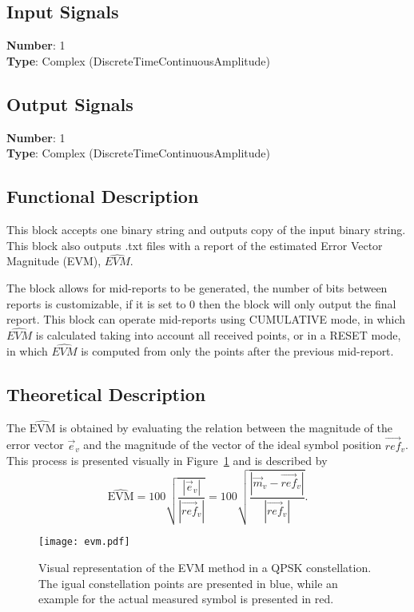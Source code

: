 \begin{refsection}
\begin{itemize}
\end{itemize}




\subsection*{Input Signals}

\textbf{Number}: 1\\
\textbf{Type}: Complex (DiscreteTimeContinuousAmplitude)


\subsection*{Output Signals}

\textbf{Number}: 1\\
\textbf{Type}: Complex (DiscreteTimeContinuousAmplitude)

\subsection*{Functional Description}

This block accepts one binary string and outputs copy of the input binary string. This block also outputs .txt files with a report of the estimated Error Vector Magnitude (EVM), $\widehat{EVM}$.
\par
The block allows for mid-reports to be generated, the number of bits between reports is customizable, if it is set to 0 then the block will only output the final report. This block can operate mid-reports using CUMULATIVE mode, in which $\widehat{EVM}$ is calculated taking into account all received points, or in a RESET mode, in which $\widehat{EVM}$ is computed from only the points after the previous mid-report.

\subsection*{Theoretical Description}

The $\widehat{\text{EVM}}$ is obtained by evaluating the relation between the magnitude of the error vector $\vec{e}_v$ and the magnitude of the vector of the ideal symbol position $\vec{ref}_v$. This process is presented visually in Figure~\ref{fig:EVM} and is described by
\begin{equation}
\widehat{\text{EVM}}=100\sqrt{\frac{|\vec{e}_v|}{|\vec{ref}_v|}}=100\sqrt{\frac{|\vec{m}_v-\vec{ref}_v|}{|\vec{ref}_v|}}.
\end{equation}

\begin{figure}[h]
\centering
\texttt{[image: evm.pdf]}
\caption{Visual representation of the EVM method in a QPSK constellation. The igual constellation points are presented in blue, while an example for the actual measured symbol is presented in red.}
\label{fig:EVM}
\end{figure}


\clearpage
\printbibliography[heading=subbibliography]
\end{refsection}
\cleardoublepage
